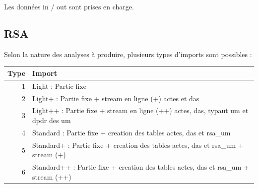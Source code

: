 \documentclass[]{book}
\theoremstyle{definition}
\theoremstyle{definition}
\theoremstyle{definition}
\theoremstyle{remark}
\begin{document}
Les données in / out sont prises en charge.

\subsection{RSA}\label{rsa}

Selon la nature des analyses à produire, plusieurs types d'imports sont
possibles :

\begin{longtable}[]{@{}rl@{}}
\toprule
\begin{minipage}[b]{0.06\columnwidth}\raggedleft\strut
Type\strut
\end{minipage} & \begin{minipage}[b]{0.88\columnwidth}\raggedright\strut
Import\strut
\end{minipage}\tabularnewline
\midrule
\endhead
\begin{minipage}[t]{0.06\columnwidth}\raggedleft\strut
1\strut
\end{minipage} & \begin{minipage}[t]{0.88\columnwidth}\raggedright\strut
Light : Partie fixe\strut
\end{minipage}\tabularnewline
\begin{minipage}[t]{0.06\columnwidth}\raggedleft\strut
2\strut
\end{minipage} & \begin{minipage}[t]{0.88\columnwidth}\raggedright\strut
Light+ : Partie fixe + stream en ligne (+) actes et das\strut
\end{minipage}\tabularnewline
\begin{minipage}[t]{0.06\columnwidth}\raggedleft\strut
3\strut
\end{minipage} & \begin{minipage}[t]{0.88\columnwidth}\raggedright\strut
Light++ : Partie fixe + stream en ligne (++) actes, das, typaut um et
dpdr des um\strut
\end{minipage}\tabularnewline
\begin{minipage}[t]{0.06\columnwidth}\raggedleft\strut
4\strut
\end{minipage} & \begin{minipage}[t]{0.88\columnwidth}\raggedright\strut
Standard : Partie fixe + creation des tables actes, das et rsa\_um\strut
\end{minipage}\tabularnewline
\begin{minipage}[t]{0.06\columnwidth}\raggedleft\strut
5\strut
\end{minipage} & \begin{minipage}[t]{0.88\columnwidth}\raggedright\strut
Standard+ : Partie fixe + creation des tables actes, das et rsa\_um +
stream (+)\strut
\end{minipage}\tabularnewline
\begin{minipage}[t]{0.06\columnwidth}\raggedleft\strut
6\strut
\end{minipage} & \begin{minipage}[t]{0.88\columnwidth}\raggedright\strut
Standard++ : Partie fixe + creation des tables actes, das et rsa\_um +
stream (++)\strut
\end{minipage}\tabularnewline
\bottomrule
\end{longtable}
\end{document}
